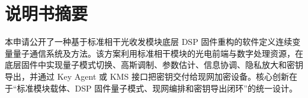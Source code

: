﻿\documentclass[12pt,a4paper]{article}
\begin{document}
\section{说明书摘要}
本申请公开了一种基于标准相干光收发模块底层 DSP 固件重构的软件定义连续变量量子通信系统及方法。该方案利用标准相干模块的光电前端与数字处理资源，在底层固件中实现量子模式切换、高斯调制、参数估计、信息协调、隐私放大和密钥导出，并通过 Key Agent 或 KMS 接口把密钥交付给现网加密设备。核心创新在于“标准模块载体、DSP 固件量子模式、现网编排和密钥导出闭环”的统一设计。
\end{document}
